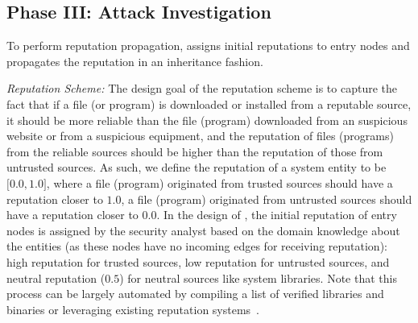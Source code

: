 \subsection{Phase III: Attack Investigation}
\label{subsec:attack-investigation}



To perform reputation propagation, \tool assigns initial reputations to entry nodes and propagates the reputation in an inheritance fashion.

\emph{Reputation Scheme:}
The design goal of the reputation scheme is to capture the fact that if a file (or program) is downloaded or installed from a reputable source, it should be more reliable than the file (program) downloaded from an suspicious website or from a suspicious equipment, and the reputation of files (programs) from the reliable sources should be higher than the reputation of those from untrusted sources. 
As such, we define the reputation of a system entity to be $\lbrack0.0,1.0\rbrack$, where a file (program) originated from trusted sources should have a reputation closer to $1.0$, a file (program) originated from untrusted sources
should have a reputation closer to $0.0$.
In the design of \tool,
the initial reputation of entry nodes is assigned by the security analyst based on the domain knowledge about the entities (as these nodes have no incoming edges for receiving reputation): high reputation for trusted sources, low reputation for untrusted sources, and neutral reputation (\ie $0.5$) for neutral sources like system libraries.
Note that this process can be largely automated by compiling a list of verified libraries and binaries or leveraging existing reputation systems~\cite{ipreputation1,ipreputation2}.




